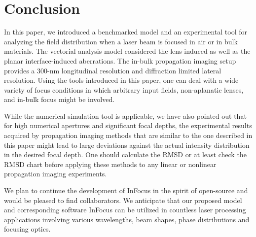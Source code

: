 \documentclass[9pt,twocolumn,twoside]{osajnl}
\begin{document}
\section{Conclusion}
In this paper, we introduced a benchmarked model and an experimental tool for analyzing the field distribution when a laser beam is focused in air or in bulk materials. The vectorial analysis model considered the lens-induced as well as the planar interface-induced aberrations. The in-bulk propagation imaging setup provides a 300-nm longitudinal resolution and diffraction limited lateral resolution. Using the tools introduced in this paper, one can deal with a wide variety of focus conditions in which arbitrary input fields, non-aplanatic lenses, and in-bulk focus might be involved. 

While the numerical simulation tool is applicable, we have also pointed out that for high numerical apertures and significant focal depths, the experimental results acquired by propagation imaging methods that are similar to the one described in this paper might lead to large deviations against the actual intensity distribution in the desired focal depth. One should calculate the RMSD or at least check the RMSD chart before applying these methods to any linear or nonlinear propagation imaging experiments. 

We plan to continue the development of InFocus \cite{InFocus} in the spirit of open-source and would be pleased to find collaborators. We anticipate that our proposed model and corresponding software InFocus can be utilized in countless laser processing applications involving various wavelengths, beam shapes, phase distributions and focusing optics.

\end{document}

